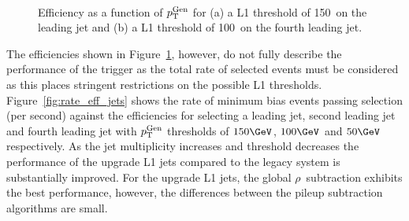 \begin{figure}
    \begin{center} 
	~
	\caption{Efficiency as a function of ${p_{\text T}^{\text{Gen}}}$ for (a) a L1 threshold of 150\GeV~on the leading jet and (b) 
	a L1 threshold of 100\GeV~on the fourth leading jet.}
	    \label{fig:turnon}
    \end{center} 
\end{figure}

The efficiencies shown in Figure~\ref{fig:turnon}, however, do not fully describe the performance 
of the trigger as the total rate of selected events must be considered as this places 
stringent restrictions on the possible L1 thresholds. Figure~\ref{fig:rate_eff_jets} shows the rate of 
minimum bias events passing selection (per second) against the efficiencies for selecting 
a leading jet, second leading jet and fourth leading jet with ${p_{\text T}^{\text{Gen}}}$ thresholds of $150\GeV$,
$100\GeV$ and $50\GeV$ respectively. As the jet multiplicity increases and threshold decreases
the performance of the upgrade L1 jets compared to the legacy system is substantially improved.
For the upgrade L1 jets, the global $\rho$~subtraction exhibits the best performance, however, the differences 
between the pileup subtraction algorithms are small.

